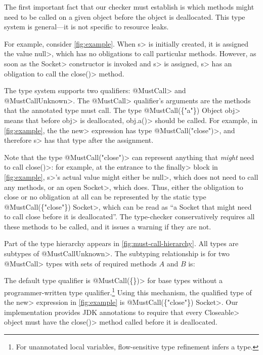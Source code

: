 The first important fact that our checker must establish
is which methods might need to be called on
a given object before the object is deallocated.
This type system is general---it is not specific
to resource leaks.

For example, consider \cref{fig:example}. When \<s> is initially
created, it is assigned the value \<null>, which has no obligations
to call particular methods. However, as soon as the \<Socket> constructor
is invoked and \<s> is assigned, \<s> has an obligation to call the
\<close()> method.


The type system supports two qualifiers: \<@MustCall> and
\<@MustCallUnknown>. The \<@MustCall> qualifier's arguments are the
methods that the annotated type must call. The type
\<@MustCall(\{"a"\}) Object obj> means that before \<obj> is
deallocated, \<obj.a()> should be called.
For example, in \cref{fig:example}, the
the \<new> expression has type \<@MustCall("close")>, and therefore
\<s> has that type after the assignment.

Note that the type \<@MustCall("close")>
can represent anything that \emph{might} need to
call \<close()>: for example, at the entrance to
the \<finally> block in \cref{fig:example}, \<s>'s
actual value might either be \<null>, which does not
need to call any methods, or an open \<Socket>, which does.
Thus, either the obligation to close or no obligation at all
can be represented by the static
type \<@MustCall(\{"close"\}) Socket>, which can be read as ``a
Socket that might need to call close before it is deallocated''.
The type-checker conservatively requires all these methods to be called,
and it issues a warning if they are not.

Part of the type hierarchy appears in \cref{fig:must-call-hierarchy}.
All types are subtypes of \<@MustCallUnknown>.
The subtyping relationship is for two \<@MustCall> types with sets
of required methods $A$ and $B$ is:

The default type qualifier is \<@MustCall(\{\})> for base types without a
programmer-written type qualifier.\footnote{For unannotated local variables,
  flow-sensitive type refinement infers a type.}
Using this mechanism, the qualified type of the \<new> expression
in \cref{fig:example}
is \<@MustCall(\{"close"\}) Socket>. Our implementation
provides JDK annotations to require that every 
\<Closeable> object must have the \<close()> method called before
it is deallocated.

